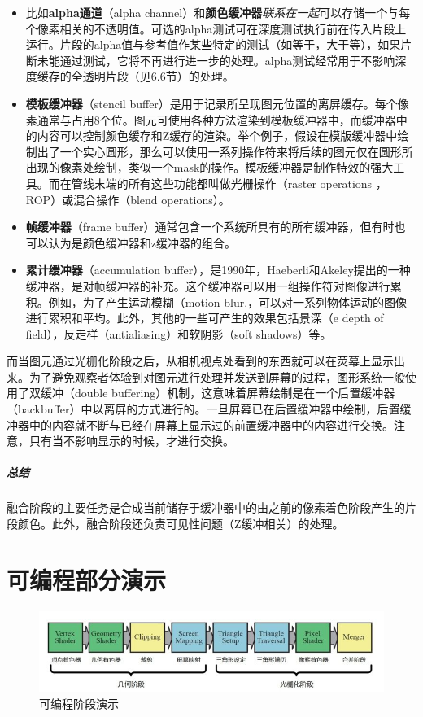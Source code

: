 \documentclass[UTF8,a4paper,12pt]{ctexbook}
\begin{document}
				\begin{itemize}	
					\item 比如\textbf{alpha通道}（alpha channel）和\textbf{颜色缓冲器}\textit{联系在一起}可以存储一个与每个像素相关的不透明值。可选的alpha测试可在深度测试执行前在传入片段上运行。片段的alpha值与参考值作某些特定的测试（如等于，大于等），如果片断未能通过测试，它将不再进行进一步的处理。alpha测试经常用于不影响深度缓存的全透明片段（见6.6节）的处理。
									
					\item \textbf{模板缓冲器}（stencil buffer）是用于记录所呈现图元位置的离屏缓存。每个像素通常与占用8个位。图元可使用各种方法渲染到模板缓冲器中，而缓冲器中的内容可以控制颜色缓存和Z缓存的渲染。举个例子，假设在模版缓冲器中绘制出了一个实心圆形，那么可以使用一系列操作符来将后续的图元仅在圆形所出现的像素处绘制，类似一个mask的操作。模板缓冲器是制作特效的强大工具。而在管线末端的所有这些功能都叫做光栅操作（raster operations ，ROP）或混合操作（blend operations）。
									
					\item \textbf{帧缓冲器}（frame buffer）通常包含一个系统所具有的所有缓冲器，但有时也可以认为是颜色缓冲器和z缓冲器的组合。
									
					\item \textbf{累计缓冲器}（accumulation buffer），是1990年，Haeberli和Akeley提出的一种缓冲器，是对帧缓冲器的补充。这个缓冲器可以用一组操作符对图像进行累积。例如，为了产生运动模糊（motion blur.，可以对一系列物体运动的图像进行累积和平均。此外，其他的一些可产生的效果包括景深（e depth of field），反走样（antialiasing）和软阴影（soft shadows）等。
				\end{itemize}

				而当图元通过光栅化阶段之后，从相机视点处看到的东西就可以在荧幕上显示出来。为了避免观察者体验到对图元进行处理并发送到屏幕的过程，图形系统一般使用了双缓冲（double buffering）机制，这意味着屏幕绘制是在一个后置缓冲器（backbuffer）中以离屏的方式进行的。一旦屏幕已在后置缓冲器中绘制，后置缓冲器中的内容就不断与已经在屏幕上显示过的前置缓冲器中的内容进行交换。注意，只有当不影响显示的时候，才进行交换。
				
				\subparagraph{总结}融合阶段的主要任务是合成当前储存于缓冲器中的由之前的像素着色阶段产生的片段颜色。此外，融合阶段还负责可见性问题（Z缓冲相关）的处理。

	\section{可编程部分演示}
		\begin{figure}[H]
			\centering
			\includegraphics[scale=0.57]{ProgramAble}
			\caption{可编程阶段演示}
		\end{figure}	
		
\end{document}
